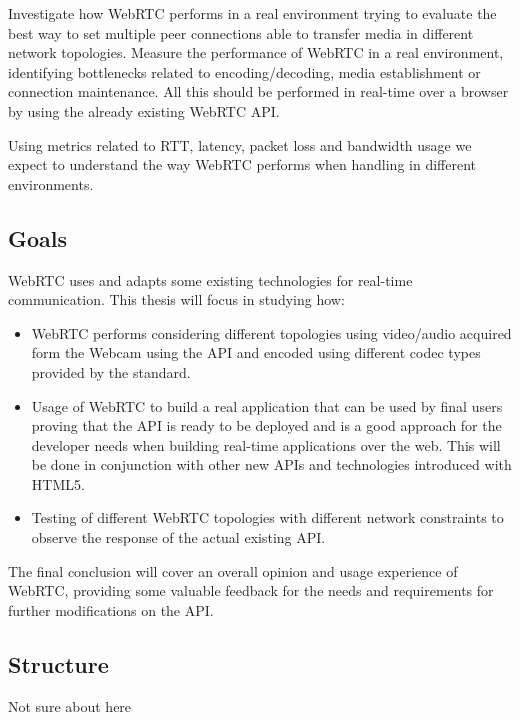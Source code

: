 Investigate how WebRTC performs in a real environment trying to evaluate the best way to set multiple peer connections able to transfer media in different network topologies. Measure the performance of WebRTC in a real environment, identifying bottlenecks related to encoding/decoding, media establishment or connection maintenance. All this should be performed in real-time over a browser by using the already existing WebRTC API.

Using metrics related to RTT, latency, packet loss and bandwidth usage we expect to understand the way WebRTC performs when handling in different environments.

\subsection{Goals}

WebRTC uses and adapts some existing technologies for real-time communication. This thesis will focus in studying how:

\begin{itemize}
	\item WebRTC performs considering different topologies using video/audio acquired form the Webcam using the API and encoded using different codec types provided by the standard.

	\item Usage of WebRTC to build a real application that can be used by final users proving that the API is ready to be deployed and is a good approach for the developer needs when building real-time applications over the web. This will be done in conjunction with other new APIs and technologies introduced with HTML5.
	
	\item Testing of different WebRTC topologies with different network constraints to observe the response of the actual existing API.
\end{itemize}

The final conclusion will cover an overall opinion and usage experience of WebRTC, providing some valuable feedback for the needs and requirements for further modifications on the API.

\subsection{Structure}

Not sure about here